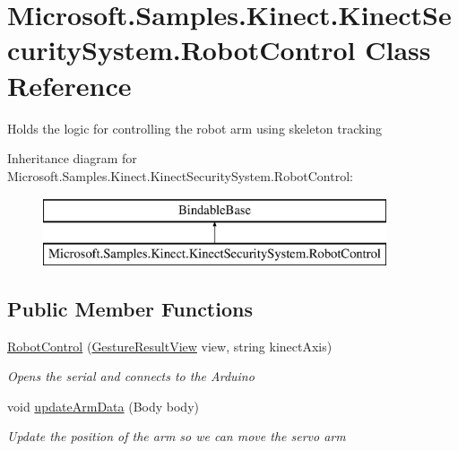 \hypertarget{class_microsoft_1_1_samples_1_1_kinect_1_1_kinect_security_system_1_1_robot_control}{}\section{Microsoft.\+Samples.\+Kinect.\+Kinect\+Security\+System.\+Robot\+Control Class Reference}
\label{class_microsoft_1_1_samples_1_1_kinect_1_1_kinect_security_system_1_1_robot_control}


Holds the logic for controlling the robot arm using skeleton tracking  


Inheritance diagram for Microsoft.\+Samples.\+Kinect.\+Kinect\+Security\+System.\+Robot\+Control\+:\begin{figure}[H]
\begin{center}
\leavevmode
\includegraphics[height=2.000000cm]{class_microsoft_1_1_samples_1_1_kinect_1_1_kinect_security_system_1_1_robot_control}
\end{center}
\end{figure}
\subsection*{Public Member Functions}
\begin{DoxyCompactItemize}
\item 
\hyperlink{class_microsoft_1_1_samples_1_1_kinect_1_1_kinect_security_system_1_1_robot_control_acd1a271344cf99d83ddf38f50b49fdb9}{Robot\+Control} (\hyperlink{class_microsoft_1_1_samples_1_1_kinect_1_1_kinect_security_system_1_1_gesture_result_view}{Gesture\+Result\+View} view, string kinect\+Axis)
\begin{DoxyCompactList}\small\item\em Opens the serial and connects to the Arduino \end{DoxyCompactList}\item 
void \hyperlink{class_microsoft_1_1_samples_1_1_kinect_1_1_kinect_security_system_1_1_robot_control_aa66c741083e13b1720ffbd5e848ddd4b}{update\+Arm\+Data} (Body body)
\begin{DoxyCompactList}\small\item\em Update the position of the arm so we can move the servo arm \end{DoxyCompactList}\end{DoxyCompactItemize}
